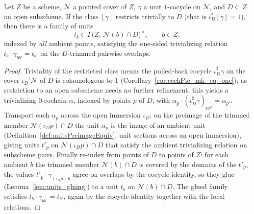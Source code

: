\begin{theorem}
  \label{thm:exists_trimmed_trivializing}
  \leanok
  Let \(Z\) be a scheme, \(\mathcal N\) a pointed cover of \(Z\), \(\gamma\) a unit \(1\)-cocycle on
  \(\mathcal N\), and \(D \subseteq Z\) an open subscheme. If the class \([\gamma]\) restricts
  trivially to \(D\) (that is \(\iota_D^{*}[\gamma] = 1\)), then there is a family of units
  \[
    t_b \in \Gamma\bigl(Z,\, \mathcal N(b) \cap D\bigr)^{\times}, \qquad b \in Z,
  \]
  indexed by \emph{all} ambient points, satisfying the one-sided trivializing relation \(t_b \cdot
  \gamma_{b b'} = t_{b'}\) on the \(D\)-trimmed pairwise overlaps.
\end{theorem}
\begin{proof}
  \leanok
  Triviality of the restricted class means the pulled-back cocycle \(\iota_D^{\sharp}\gamma\) on the
  cover \(\iota_D^{-1}\mathcal N\) of \(D\) is cohomologous to \(1\)
  (Corollary~\ref{cor:cechPic_mk_eq_one}); as restriction to an open subscheme needs no further
  refinement, this yields a trivializing \(0\)-cochain \(\alpha\), indexed by points \(p\) of \(D\),
  with \(\alpha_p \cdot (\iota_D^{\sharp}\gamma)_{p p'} = \alpha_{p'}\). Transport each \(\alpha_p\)
  across the open immersion \(\iota_D\): on the preimage of the trimmed member \(\mathcal
  N(\iota_D p) \cap D\) the unit \(\alpha_p\) is the image of an ambient unit
  (Definition~\ref{def:unitsPreimageEquiv}, unit sections across an open immersion), giving units
  \(t'_p\) on \(\mathcal N(\iota_D p) \cap D\) that satisfy the ambient trivializing relation on
  subscheme pairs. Finally re-index from points of \(D\) to points of \(Z\): for each ambient \(b\)
  the trimmed member \(\mathcal N(b) \cap D\) is covered by the domains of the \(t'_p\), the values
  \(t'_p \cdot \gamma_{(\iota_D p)\, b}\) agree on overlaps by the cocycle identity, so they glue
  (Lemma~\ref{lem:units_gluing}) to a unit \(t_b\) on \(\mathcal N(b) \cap D\). The glued family
  satisfies \(t_b \cdot \gamma_{b b'} = t_{b'}\), again by the cocycle identity together with the
  local relations.
\end{proof}

